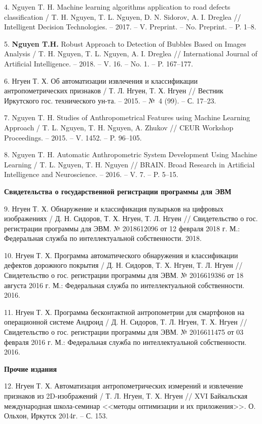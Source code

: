 4. Nguyen T. H. Machine learning algorithms application to road defects classification / T. H. Nguyen, T. L. Nguyen, D. N. Sidorov, A. I. Dreglea // Intelligent Decision Technologies. -- 2017. -- V. Preprint. -- No. Preprint. -- P. 1--8.

5. \textbf{Nguyen T.H.} Robust Approach to Detection of Bubbles Based on Images Analysis / T. H. Nguyen, T. L. Nguyen, A. I. Dreglea // International Journal of Artificial Intelligence. -- 2018. -- V. 16. -- No. 1. -- P. 167--177.

6. Нгуен Т. Х. Об автоматизации извлечения и классификации антропометрических признаков / Т. Л. Нгуен, Т. Х. Нгуен // Вестник Иркутского гос. технического ун-та. -- 2015. -- №~4 (99). -- С. 17--23.

7. Nguyen T. H. Studies of Anthropometrical Features using Machine Learning Approach / T. L. Nguyen, T. H. Nguyen, A. Zhukov // CEUR Workshop Proceedings. -- 2015. -- V. 1452. -- P. 96--105.

8. Nguyen T. H. Automatic Anthropometric System Development Using Machine Learning / T. L. Nguyen, T. H. Nguyen // BRAIN. Broad Research in Artificial Intelligence and Neuroscience. -- 2016. -- V. 7. -- P. 5--15.

 \textbf{Свидетельства о государственной регистрации программы для ЭВМ}

9. Нгуен Т. Х. Обнаружение и классификация пузырьков на цифровых изображениях / Д. Н. Сидоров, Т. Х. Нгуен, Т. Л. Нгуен // Свидетельство о гос. регистрации программы для ЭВМ. № 2018612096 от 12 февраля 2018 г. М.: Федеральная служба по интеллектуальной собственности. 2018.
 
10. Нгуен Т. Х. Программа автоматического обнаружения и классификации дефектов дорожного покрытия / Д. Н. Сидоров, Т. Х. Нгуен, Т. Л. Нгуен // Свидетельство о гос. регистрации программы для ЭВМ. № 2016619386 от 18 августа 2016 г. М.: Федеральная служба по интеллектуальной собственности. 2016.

11. Нгуен Т. Х. Программа бесконтактной антропометрии для смартфонов на операционной системе Андроид / Д. Н. Сидоров, Т. Л. Нгуен, Т. Х. Нгуен // Свидетельство о гос. регистрации программы для ЭВМ. № 2016611475 от 03 февраля 2016 г. М.: Федеральная служба по интеллектуальной собственности. 2016.
	
\textbf{Прочие издания}
	
12. Нгуен Т. Х. Автоматизация антропометрических измерений и извлечение признаков из 2D-изображений / Т. Л. Нгуен, Т. Х. Нгуен // XVI Байкальская международная школа-семинар <<методы оптимизации и их приложения>>. О. Ольхон, Иркутск 2014г. -- С. 153.

